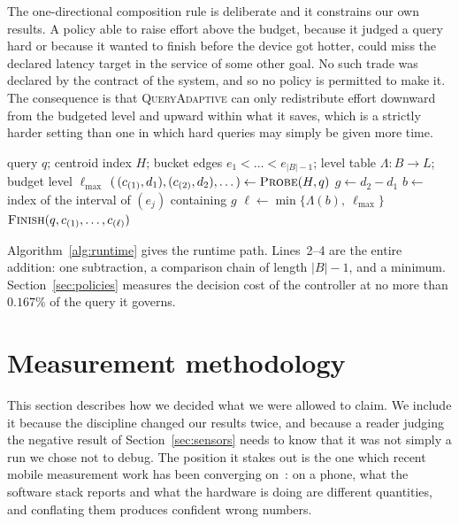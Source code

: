\documentclass[journal]{IEEEtran}
\begin{document}
The one-directional composition rule is deliberate and it constrains our
own results. A policy able to raise effort above the budget, because it
judged a query hard or because it wanted to finish before the device got
hotter, could miss the declared latency target in the service of some other
goal. No such trade was declared by the contract of the system, and so no
policy is permitted to make it. The consequence is that
\textsc{QueryAdaptive} can only redistribute effort downward from the
budgeted level and upward within what it saves, which is a strictly harder
setting than one in which hard queries may simply be given more time.

\begin{algorithm}[!t]
\caption{Query-adaptive retrieval, runtime path}
\label{alg:runtime}
\begin{algorithmic}[1]
\Require query $q$; centroid index $H$; bucket edges $e_1 < \dots < e_{|B|-1}$;
         level table $\Lambda : B \to L$; budget level $\ell_{\max}$
\State $(\,(c_{(1)}, d_1), (c_{(2)}, d_2), \dots\,) \gets \textsc{Probe}(H, q)$
\State $g \gets d_2 - d_1$ 
\State $b \gets$ index of the interval of $(e_j)$ containing $g$
\State $\ell \gets \min\{\Lambda(b),\ \ell_{\max}\}$ 
\State \Return $\textsc{Finish}(q, c_{(1)}, \dots, c_{(\ell)})$
\end{algorithmic}
\end{algorithm}

Algorithm~\ref{alg:runtime} gives the runtime path. Lines~2--4 are the
entire addition: one subtraction, a comparison chain of length $|B|-1$, and
a minimum. Section~\ref{sec:policies} measures the decision cost of the
controller at no more than $0.167\%$ of the query it governs.

\section{Measurement methodology}
\label{sec:method}

This section describes how we decided what we were allowed to claim. We
include it because the discipline changed our results twice, and because a
reader judging the negative result of Section~\ref{sec:sensors} needs to
know that it was not simply a run we chose not to debug. The position it
stakes out is the one which recent mobile measurement work has been
converging
on~\cite{laskaridis2024melt,cai2026npuready,ehsani2026sustainability}: on a
phone, what the software stack reports and what the hardware is doing are
different quantities, and conflating them produces confident wrong numbers.
\end{document}
